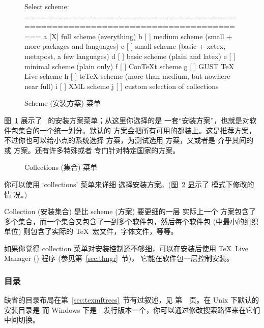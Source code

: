 \documentclass{article}
\begin{document}
\begin{figure}[tbh]
\begin{boxedverbatim}
Select scheme:
===============================================================================
 a [X] full scheme (everything)
 b [ ] medium scheme (small + more packages and languages)
 c [ ] small scheme (basic + xetex, metapost, a few languages)
 d [ ] basic scheme (plain and latex)
 e [ ] minimal scheme (plain only)
 f [ ] ConTeXt scheme
 g [ ] GUST TeX Live scheme
 h [ ] teTeX scheme (more than medium, but nowhere near full)
 i [ ] XML scheme
 j [ ] custom selection of collections
\end{boxedverbatim}
\caption{Scheme (安装方案) 菜单}\label{fig:scheme-text}
\end{figure}

图~\ref{fig:scheme-text} 展示了 \TL\ 的安装方案菜单；从这里你选择的是
一套``安装方案''，也就是对软件包集合的一个统一划分。默认的 
方案会把所有可用的都装上。这是推荐方案，不过你也可以给小点的系统选择
 方案，为测试选用  方案，又或者是
介乎其间的  或  方案。还有许多特殊或者
专门针对特定国家的方案。

\begin{figure}[tb]
\caption{Collections (集合) 菜单}\label{fig:collections-gui}
\end{figure}

你可以使用 `collections' 菜单来详细
选择安装方案。(图~\ref{fig:collections-gui} 显示了 \GUI 模式下修改的情
况。)

Collection (安装集合) 是比 scheme (方案) 要更细的一层 \Dash 实际上一个
方案包含了多个集合，而一个集合又包含了一到多个软件包，然后每个软件包
(\TL 中最小的组织单位) 则包含了实际的 \TeX\ 宏文件，字体文件，等等。

如果你觉得 collection 菜单对安装控制还不够细，可以在安装后使用
\TeX\ Live Manager () 程序 (参见第~\ref{sec:tlmgr}~节)，
它能在软件包一层控制安装。

\subsubsection{目录}
\label{sec:directories}

缺省的目录布局在第~\ref{sec:texmftrees}~节有过叙述，见
第~\pageref{sec:texmftrees}~页。在 Unix 下默认的安装目录是
 而 Windows 下是
|%
发行版本一个，你可以通过修改搜索路径来在它们中间切换。
\end{document}
